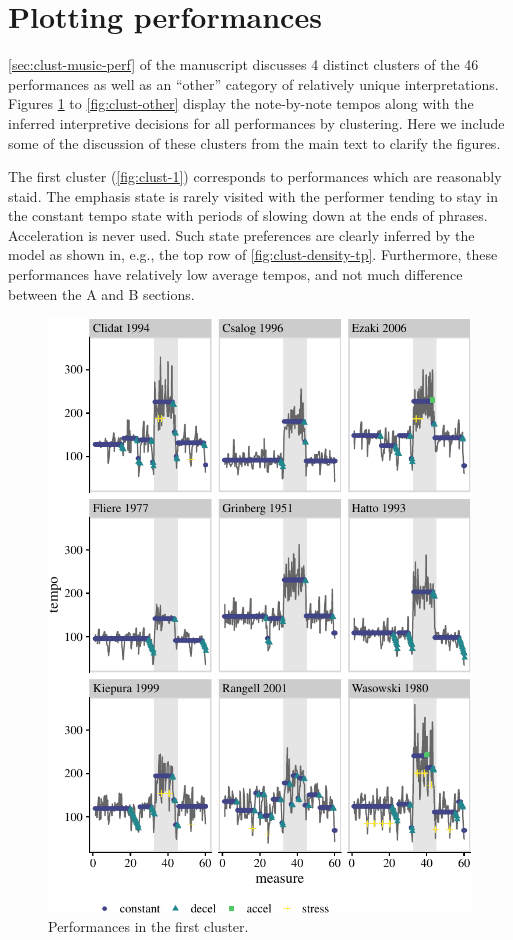 \documentclass[aoas]{imsart}
\begin{document}
\hypertarget{plotting-performances}{%
\section{Plotting performances}\label{plotting-performances}}

\autoref{sec:clust-music-perf} of the manuscript discusses 4 distinct
clusters of the 46 performances as well as an ``other'' category of
relatively unique interpretations. Figures \ref{fig:clust-1} to
\ref{fig:clust-other} display the note-by-note tempos along with the
inferred interpretive decisions for all performances by clustering. Here
we include some of the discussion of these clusters from the main text
to clarify the figures.

The first cluster (\autoref{fig:clust-1}) corresponds to performances
which are reasonably staid. The emphasis state is rarely visited with
the performer tending to stay in the constant tempo state with periods
of slowing down at the ends of phrases. Acceleration is never used. Such
state preferences are clearly inferred by the model as shown in, e.g.,
the top row of \autoref{fig:clust-density-tp}. Furthermore, these
performances have relatively low average tempos, and not much difference
between the A and B sections.

\begin{figure}

{\centering \includegraphics{gfx/clust-1-1} 

}

\caption{Performances in the first cluster.}\label{fig:clust-1}
\end{figure}
\end{document}
